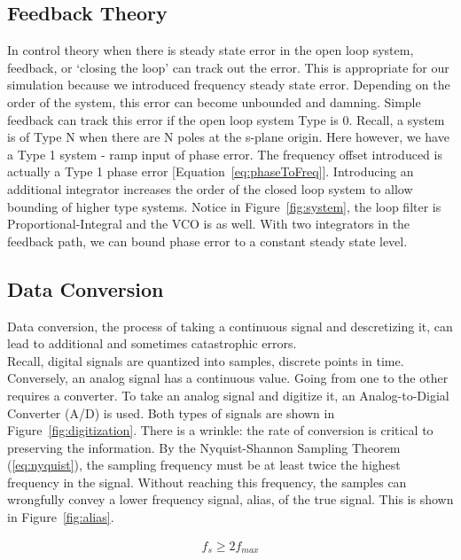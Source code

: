 \documentclass[]{article}
\begin{document}
\subsection{Feedback Theory}
\label{app:feedback}
In control theory when there is steady state error in the open loop system, feedback, or `closing the loop' can track out the error. This is appropriate for our simulation because we introduced frequency steady state error.  Depending on the order of the system, this error can become unbounded and damning.  Simple feedback can track this error if the open loop system Type is 0.  Recall, a system is of Type N when there are N poles at the s-plane origin.  Here however, we have a Type 1 system - ramp input of phase error.  The frequency offset introduced is actually a Type 1 phase error [Equation~\ref{eq:phaseToFreq}].  Introducing an additional integrator increases the order of the closed loop system to allow bounding of higher type systems. Notice in Figure~\ref{fig:system}, the loop filter is Proportional-Integral and the VCO is as well. With two integrators in the feedback path, we can bound phase error to a constant steady state level.  \\

\subsection{Data Conversion}
\label{app:converter}
Data conversion, the process of taking a continuous signal and descretizing it, can lead to additional and sometimes catastrophic errors.\\

Recall, digital signals are quantized into samples, discrete points in time.  Conversely, an analog signal has a continuous value.  Going from one to the other requires a converter.  To take an analog signal and digitize it, an Analog-to-Digial Converter (A/D) is used.  Both types of signals are shown in Figure~\ref{fig:digitization}.  There is a wrinkle: the rate of conversion is critical to preserving the information.  By the Nyquist-Shannon Sampling Theorem (\ref{eq:nyquist}), the sampling frequency must be at least twice the highest frequency in the signal.  Without reaching this frequency, the samples can wrongfully convey a lower frequency signal, alias, of the true signal.  This is shown in Figure~\ref{fig:alias}.  

\begin{align}
\label{eq:nyquist}
f_s \geq 2 f_{max}
\end{align}
\end{document}

